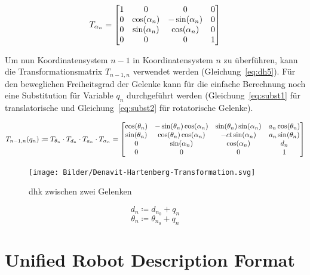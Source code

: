 \begin{equation}
    T_{\alpha_n} =
    \begin{bmatrix}
        1 & 0   & 0    & 0 \\
        0 & \cos(\alpha_n) & -\sin(\alpha_n) & 0 \\
        0 & \sin(\alpha_n) & \cos(\alpha_n)  & 0 \\
        0 & 0   & 0    & 1 \\
    \end{bmatrix}
    \label{eq:dh4}
\end{equation}

Um nun Koordinatensystem $n-1$ in Koordinatensystem $n$ zu überführen, kann die Transformationsmatrix $T_{n-1,n}$ verwendet werden (Gleichung~\ref{eq:dh5}).
Für den beweglichen Freiheitsgrad der Gelenke kann für die einfache Berechnung noch eine Substitution für Variable $q_n$ durchgeführt werden (Gleichung~\ref{eq:subst1} für translatorische und Gleichung~\ref{eq:subst2} für rotatorische Gelenke).

\begin{equation}
    T_{n-1,n}(q_n) \coloneqq T_{\theta_n} \cdot T_{d_n} \cdot T_{a_n} \cdot T_{\alpha_n} =
    \begin{bmatrix}
        \cos(\theta_n) & -\sin(\theta_n)\cos(\alpha_n) & \sin(\theta_n)\sin(\alpha_n) & a_n\cos(\theta_n) \\
        \sin(\theta_n) & \cos(\theta_n)\cos(\alpha_n)  & -ct\sin(\alpha_n) & a_n\sin(\theta_n) \\
        0   & \sin(\alpha_n)     & \cos(\alpha_n)    & d_n    \\
        0   & 0       & 0      & 1      \\
    \end{bmatrix}
    \label{eq:dh5}
\end{equation}

\begin{figure}[h]
    \centering
    \texttt{[image: Bilder/Denavit-Hartenberg-Transformation.svg]}
    \caption{\ac{dhk} zwischen zwei Gelenken~\cite{jahobrCoordinateSystemsDenavitHartenberg2007}}\label{fig:dh-konvention1}
\end{figure}


\begin{equation}
    d_n \coloneqq d_{n_0} + q_n    \label{eq:subst1}
\end{equation}
\begin{equation}
    \theta_n \coloneqq \theta_{n_0} + q_n    \label{eq:subst2}
\end{equation}


\section{Unified Robot Description Format}\label{sec:urdf}

